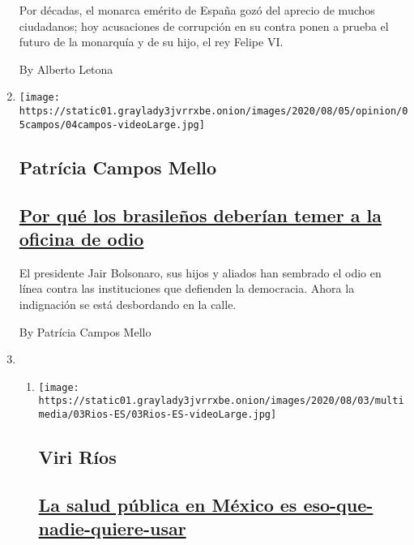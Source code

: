 \begin{enumerate}
  Por décadas, el monarca emérito de España gozó del aprecio de muchos
  ciudadanos; hoy acusaciones de corrupción en su contra ponen a prueba
  el futuro de la monarquía y de su hijo, el rey Felipe VI.

  By Alberto Letona
\item
  \texttt{[image: https://static01.graylady3jvrrxbe.onion/images/2020/08/05/opinion/05campos/04campos-videoLarge.jpg]}

  \hypertarget{patruxedcia-campos-mello}{%
  \subsection{Patrícia Campos Mello}\label{patruxedcia-campos-mello}}

  \hypertarget{por-quuxe9-los-brasileuxf1os-deberuxedan-temer-a-la-oficina-de-odio}{%
  \subsection{\texorpdfstring{\href{/es/2020/08/04/espanol/opinion/bolsonaro-oficina-odio-brasil.html}{Por
  qué los brasileños deberían temer a la oficina de
  odio}}{Por qué los brasileños deberían temer a la oficina de odio}}\label{por-quuxe9-los-brasileuxf1os-deberuxedan-temer-a-la-oficina-de-odio}}

  El presidente Jair Bolsonaro, sus hijos y aliados han sembrado el odio
  en línea contra las instituciones que defienden la democracia. Ahora
  la indignación se está desbordando en la calle.

  By Patrícia Campos Mello
\item
  \begin{enumerate}
  \def\labelenumii{\arabic{enumii}.}
  \item
    \texttt{[image: https://static01.graylady3jvrrxbe.onion/images/2020/08/03/multimedia/03Rios-ES/03Rios-ES-videoLarge.jpg]}

    \hypertarget{viri-ruxedos}{%
    \subsection{Viri Ríos}\label{viri-ruxedos}}

    \hypertarget{la-salud-puxfablica-en-muxe9xico-es-eso-que-nadie-quiere-usar}{%
    \subsection{\texorpdfstring{\href{/es/2020/08/03/espanol/opinion/servicio-salud-mexico.html}{La
    salud pública en México es
    eso-que-nadie-quiere-usar}}{La salud pública en México es eso-que-nadie-quiere-usar}}\label{la-salud-puxfablica-en-muxe9xico-es-eso-que-nadie-quiere-usar}}


\end{enumerate}
\end{enumerate}
